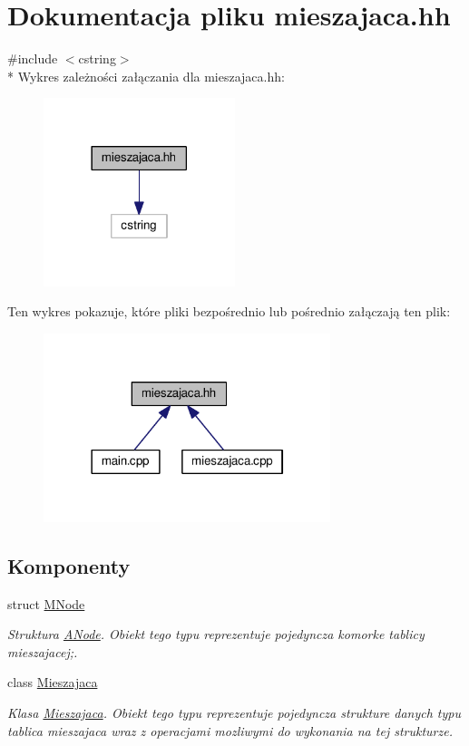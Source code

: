 \hypertarget{mieszajaca_8hh}{\section{Dokumentacja pliku mieszajaca.\-hh}
\label{mieszajaca_8hh}
}
{\ttfamily \#include $<$cstring$>$}\\*
Wykres zależności załączania dla mieszajaca.\-hh\-:
\nopagebreak
\begin{figure}[H]
\begin{center}
\leavevmode
\includegraphics[width=158pt]{mieszajaca_8hh__incl}
\end{center}
\end{figure}
Ten wykres pokazuje, które pliki bezpośrednio lub pośrednio załączają ten plik\-:
\nopagebreak
\begin{figure}[H]
\begin{center}
\leavevmode
\includegraphics[width=237pt]{mieszajaca_8hh__dep__incl}
\end{center}
\end{figure}
\subsection*{Komponenty}
\begin{DoxyCompactItemize}
\item 
struct \hyperlink{struct_m_node}{M\-Node}
\begin{DoxyCompactList}\small\item\em Struktura \hyperlink{struct_a_node}{A\-Node}. Obiekt tego typu reprezentuje pojedyncza komorke tablicy mieszajacej;. \end{DoxyCompactList}\item 
class \hyperlink{class_mieszajaca}{Mieszajaca}
\begin{DoxyCompactList}\small\item\em Klasa \hyperlink{class_mieszajaca}{Mieszajaca}. Obiekt tego typu reprezentuje pojedyncza strukture danych typu tablica mieszajaca wraz z operacjami mozliwymi do wykonania na tej strukturze. \end{DoxyCompactList}\end{DoxyCompactItemize}
